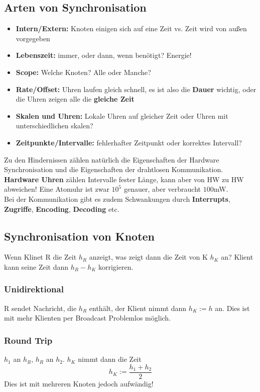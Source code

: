 \documentclass[a4paper]{article}
\begin{document}
\subsection{Arten von Synchronisation}
\begin{itemize}
	\item \textbf{Intern/Extern:} Knoten einigen sich auf eine Zeit vs. Zeit wird von außen vorgegeben
	\item \textbf{Lebenszeit:} immer, oder dann, wenn benötigt? Energie!
	\item \textbf{Scope:} Welche Knoten? Alle oder Manche?
	\item \textbf{Rate/Offset:} Uhren laufen gleich schnell, es ist also die \textbf{Dauer} wichtig, oder die Uhren zeigen alle die \textbf{gleiche Zeit}
	\item \textbf{Skalen und Uhren:} Lokale Uhren auf gleicher Zeit oder Uhren mit unterschiedlichen skalen?
	\item \textbf{Zeitpunkte/Intervalle:} fehlerhafter Zeitpunkt oder korrektes Intervall?
\end{itemize}
Zu den Hindernissen zählen natürlich die Eigenschaften der Hardware Synchronisation und die Eigenschaften der drahtlosen Kommunikation. \textbf{Hardware Uhren} zählen Intervalle fester Länge, kann aber von HW zu HW abweichen! Eine Atomuhr ist zwar $10^5$ genauer, aber verbraucht $100$mW.\\

Bei der Kommunikation gibt es zudem Schwankungen durch \textbf{Interrupts}, \textbf{Zugriffe}, \textbf{Encoding}, \textbf{Decoding} etc.

\subsection{Synchronisation von Knoten}
Wenn Klinet R die Zeit $h_R$ anzeigt, was zeigt dann die Zeit von K $h_K$ an? Klient kann seine Zeit dann $h_R-h_K$ korrigieren.
\subsubsection{Unidirektional}
R sendet Nachricht, die $h_R$ enthält, der Klient nimmt dann $h_K := h$ an. Dies ist mit mehr Klienten per Broadcast Problemlos möglich.
\subsubsection{Round Trip}
$h_1$ an $h_R$, $h_R$ an $h_2$. $h_K$ nimmt dann die Zeit
$$h_K:=\frac{h_1 + h_2}{2}$$
Dies ist mit mehreren Knoten jedoch aufwändig!
\end{document}
